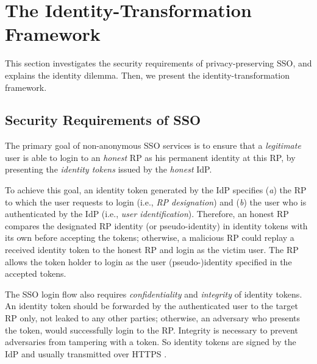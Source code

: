 \section{The Identity-Transformation Framework}
\label{sec:challenge}

This section investigates the security requirements of privacy-preserving SSO,
    and explains the identity dilemma.
Then,
    we present the identity-transformation framework.


\subsection{Security Requirements of SSO}
\label{subsec:basicrequirements}

The primary goal of non-anonymous SSO services is %
 to ensure that a \emph{legitimate} user is able to login to an \emph{honest} RP as his permanent identity at this RP, %
    by presenting the \emph{identity tokens} issued by the \emph{honest} IdP.

To achieve this goal,
 an identity token generated by the IdP \cite{OpenIDConnect,rfc6749,SAML,SAMLIdentifier,NIST2017draft,BrowserID,SPRESSO} specifies (\emph{a}) the RP to which the user requests to login (i.e., \emph{RP designation})
    and  (\emph{b}) the user who is authenticated by the IdP (i.e., \emph{user identification}).
Therefore,
    an honest RP compares the designated RP identity (or pseudo-identity) in identity tokens with its own before accepting the tokens;
     otherwise,
        a malicious RP could replay a received identity token to the honest RP and login as the victim user.
The RP allows the token holder to login as the user (pseudo-)identity specified in the accepted tokens.

The SSO login flow also requires \emph{confidentiality} and \emph{integrity} of identity tokens.
An identity token should be forwarded by the authenticated user to the target RP only,
    not leaked to any other parties;
        otherwise, an adversary who presents the token, would successfully login to the RP.
Integrity is necessary
    to prevent adversaries from tampering with a token.
So identity tokens are signed by the IdP and usually transmitted over HTTPS \cite{OpenIDConnect,rfc6749,SAML}.

